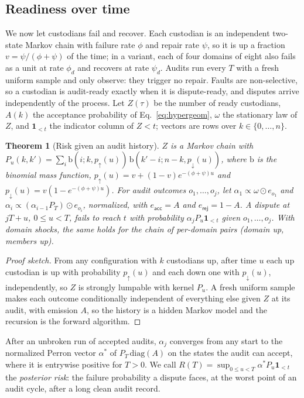 \documentclass[Crown,sagev]{sagej}
\theoremstyle{plain}
\newtheorem{theorem}{Theorem}
\theoremstyle{definition}
\theoremstyle{remark}
\begin{document}
\subsection{Readiness over time}\label{sec:temporal}

We now let custodians fail and recover. Each custodian is an independent two-state Markov chain with failure rate $\phi$ and repair rate $\psi$, so it is up a fraction $v=\psi/(\phi+\psi)$ of the time; in a variant, each of four domains of eight also fails as a unit at rate $\phi_d$ and recovers at rate $\psi_d$. Audits run every $T$ with a fresh uniform sample and only observe: they trigger no repair. Faults are non-selective, so a custodian is audit-ready exactly when it is dispute-ready, and disputes arrive independently of the process. Let $Z(\tau)$ be the number of ready custodians, $A(k)$ the acceptance probability of Eq.~\eqref{eq:hypergeom}, $\omega$ the stationary law of $Z$, and $\mathbf{1}_{<t}$ the indicator column of $Z<t$; vectors are rows over $k\in\{0,\dots,n\}$.

\begin{theorem}[Risk given an audit history]\label{thm:hmm}
$Z$ is a Markov chain with $P_u(k,k')=\sum_i \mathrm{b}(i;k,p_{\uparrow}(u))\,\mathrm{b}(k'-i;n-k,p_{\downarrow}(u))$, where $\mathrm{b}$ is the binomial mass function, $p_{\uparrow}(u)=v+(1-v)e^{-(\phi+\psi)u}$ and $p_{\downarrow}(u)=v(1-e^{-(\phi+\psi)u})$. For audit outcomes $o_1,\dots,o_j$, let $\alpha_1\propto\omega\odot e_{o_1}$ and $\alpha_i\propto(\alpha_{i-1}P_T)\odot e_{o_i}$, normalized, with $e_{\mathsf{acc}}=A$ and $e_{\mathsf{rej}}=1-A$. A dispute at $jT+u$, $0\le u<T$, fails to reach $t$ with probability $\alpha_jP_u\mathbf{1}_{<t}$ given $o_1,\dots,o_j$. With domain shocks, the same holds for the chain of per-domain pairs (domain up, members up).
\end{theorem}

\begin{proof}[Proof sketch]
From any configuration with $k$ custodians up, after time $u$ each up custodian is up with probability $p_{\uparrow}(u)$ and each down one with $p_{\downarrow}(u)$, independently, so $Z$ is strongly lumpable with kernel $P_u$. A fresh uniform sample makes each outcome conditionally independent of everything else given $Z$ at its audit, with emission $A$, so the history is a hidden Markov model and the recursion is the forward algorithm.
\end{proof}

After an unbroken run of accepted audits, $\alpha_j$ converges from any start to the normalized Perron vector $\alpha^{*}$ of $P_T\,\mathrm{diag}(A)$ on the states the audit can accept, where it is entrywise positive for $T>0$. We call $R(T)=\sup_{0\le u<T}\alpha^{*}P_u\mathbf{1}_{<t}$ the \emph{posterior risk}: the failure probability a dispute faces, at the worst point of an audit cycle, after a long clean audit record.
\end{document}
